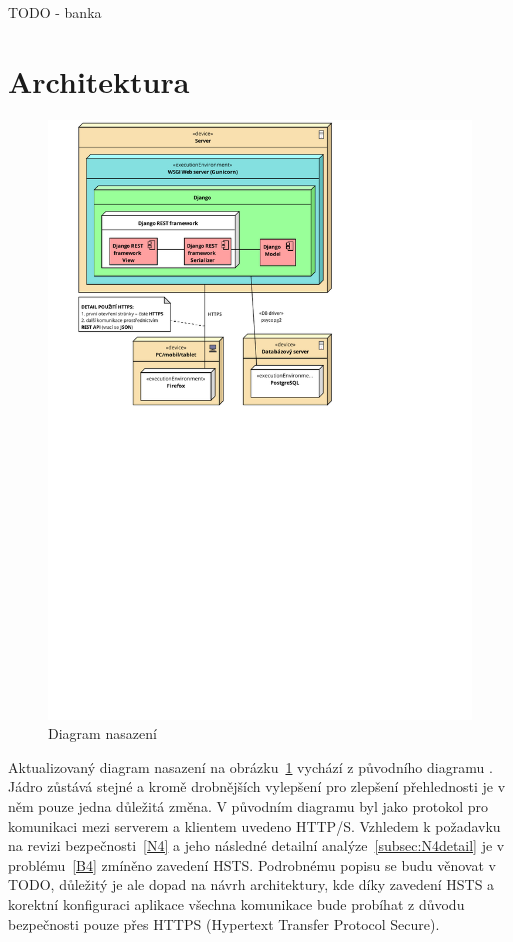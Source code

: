 TODO - banka

\section{Architektura}
    
\begin{figure}\centering
	\includegraphics[width=1\textwidth]{img/deployment-diagram}
	\caption[Diagram nasazení]{Diagram nasazení}\label{fig:deployment-diagram}
\end{figure}

Aktualizovaný diagram nasazení na obrázku~\ref{fig:deployment-diagram} vychází z původního diagramu \cite{bp}. Jádro zůstává stejné a kromě drobnějších vylepšení pro zlepšení přehlednosti je v něm pouze jedna důležitá změna. V původním diagramu byl jako protokol pro komunikaci mezi serverem a klientem uvedeno HTTP/S. Vzhledem k požadavku na revizi bezpečnosti~\ref{N4} a jeho následné detailní analýze~\ref{subsec:N4detail} je v problému~\ref{B4} zmíněno zavedení HSTS. Podrobnému popisu se budu věnovat v TODO, důležitý je ale dopad na návrh architektury, kde díky zavedení HSTS a korektní konfiguraci aplikace všechna komunikace bude probíhat z důvodu bezpečnosti pouze přes HTTPS (Hypertext Transfer Protocol Secure).

